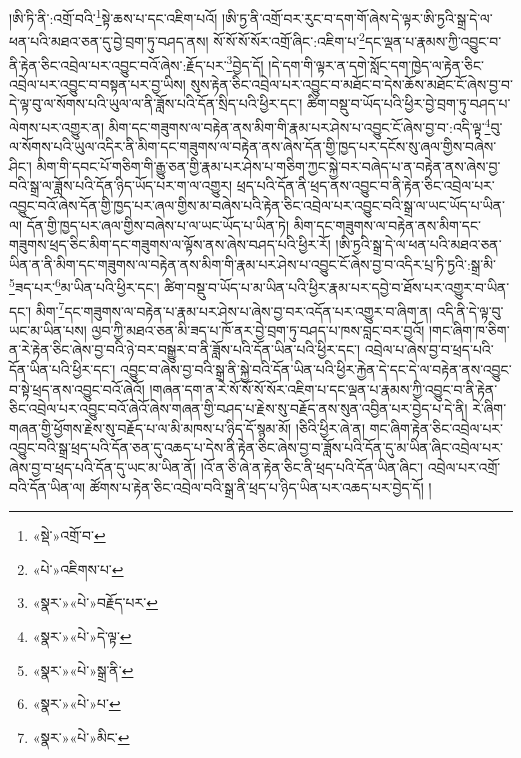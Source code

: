 །ཨི་ཏི་ནི་:འགྲོ་བའི་\footnote{«སྡེ་»འགྲོ་བ་}སྟེ་ཆས་པ་དང་འཇིག་པའོ། །ཨི་ཏྱ་ནི་འགྲོ་བར་རུང་བ་དག་གོ་ཞེས་དེ་ལྟར་ཨི་ཏྱའི་སྒྲ་དེ་ལ་ཕན་པའི་མཐའ་ཅན་དུ་བྱེ་བྲག་ཏུ་བཤད་ནས། སོ་སོ་སོ་སོར་འགྲོ་ཞིང་:འཇིག་པ་\footnote{«པེ་»འཇིགས་པ་}དང་ལྡན་པ་རྣམས་ཀྱི་འབྱུང་བ་ནི་རྟེན་ཅིང་འབྲེལ་པར་འབྱུང་བའོ་ཞེས་:རྗོད་པར་\footnote{«སྣར་»«པེ་»བརྗོད་པར་}བྱེད་དོ། །དེ་དག་གི་ལྟར་ན་དགེ་སློང་དག་ཁྱེད་ལ་རྟེན་ཅིང་འབྲེལ་པར་འབྱུང་བ་བསྟན་པར་བྱ་ཡིས། སུས་རྟེན་ཅིང་འབྲེལ་པར་འབྱུང་བ་མཐོང་བ་དེས་ཆོས་མཐོང་ངོ་ཞེས་བྱ་བ་དེ་ལྟ་བུ་ལ་སོགས་པའི་ཡུལ་ལ་ནི་ཟློས་པའི་དོན་སྲིད་པའི་ཕྱིར་དང་། ཚིག་བསྡུ་བ་ཡོད་པའི་ཕྱིར་བྱེ་བྲག་ཏུ་བཤད་པ་ལེགས་པར་འགྱུར་ན། མིག་དང་གཟུགས་ལ་བརྟེན་ནས་མིག་གི་རྣམ་པར་ཤེས་པ་འབྱུང་ངོ་ཞེས་བྱ་བ་:འདི་ལྟ་\footnote{«སྣར་»«པེ་»དེ་ལྟ་}བུ་ལ་སོགས་པའི་ཡུལ་འདིར་ནི་མིག་དང་གཟུགས་ལ་བརྟེན་ནས་ཞེས་དོན་གྱི་ཁྱད་པར་དངོས་སུ་ཞལ་གྱིས་བཞེས་ཤིང་། མིག་གི་དབང་པོ་གཅིག་གི་རྒྱུ་ཅན་གྱི་རྣམ་པར་ཤེས་པ་གཅིག་ཀྱང་སྐྱེ་བར་བཞེད་པ་ན་བརྟེན་ནས་ཞེས་བྱ་བའི་སྒྲ་ལ་ཟློས་པའི་དོན་ཉིད་ཡོད་པར་ག་ལ་འགྱུར། ཕྲད་པའི་དོན་ནི་ཕྲད་ནས་འབྱུང་བ་ནི་རྟེན་ཅིང་འབྲེལ་པར་འབྱུང་བའོ་ཞེས་དོན་གྱི་ཁྱད་པར་ཞལ་གྱིས་མ་བཞེས་པའི་རྟེན་ཅིང་འབྲེལ་པར་འབྱུང་བའི་སྒྲ་ལ་ཡང་ཡོད་པ་ཡིན་ལ། དོན་གྱི་ཁྱད་པར་ཞལ་གྱིས་བཞེས་པ་ལ་ཡང་ཡོད་པ་ཡིན་ཏེ། མིག་དང་གཟུགས་ལ་བརྟེན་ནས་མིག་དང་གཟུགས་ཕྲད་ཅིང་མིག་དང་གཟུགས་ལ་ལྟོས་ནས་ཞེས་བཤད་པའི་ཕྱིར་རོ། །ཨི་ཏྱའི་སྒྲ་དེ་ལ་ཕན་པའི་མཐའ་ཅན་ཡིན་ན་ནི་མིག་དང་གཟུགས་ལ་བརྟེན་ནས་མིག་གི་རྣམ་པར་ཤེས་པ་འབྱུང་ངོ་ཞེས་བྱ་བ་འདིར་པྲ་ཏི་ཏྱའི་:སྒྲ་མི་\footnote{«སྣར་»«པེ་»སྒྲ་ནི་}ཟད་པར་\footnote{«སྣར་»«པེ་»པ་}མ་ཡིན་པའི་ཕྱིར་དང་། ཚིག་བསྡུ་བ་ཡོད་པ་མ་ཡིན་པའི་ཕྱིར་རྣམ་པར་དབྱེ་བ་ཐོས་པར་འགྱུར་བ་ཡིན་དང་། མིག་\footnote{«སྣར་»«པེ་»མིང་}དང་གཟུགས་ལ་བརྟེན་པ་རྣམ་པར་ཤེས་པ་ཞེས་བྱ་བར་འདོན་པར་འགྱུར་བ་ཞིག་ན། འདི་ནི་དེ་ལྟ་བུ་ཡང་མ་ཡིན་པས། ལྱབ་ཀྱི་མཐའ་ཅན་མི་ཟད་པ་ཁོ་ནར་བྱེ་བྲག་ཏུ་བཤད་པ་ཁས་བླང་བར་བྱའོ། །གང་ཞིག་ཁ་ཅིག་ན་རེ་རྟེན་ཅིང་ཞེས་བྱ་བའི་ཉེ་བར་བསྒྱུར་བ་ནི་ཟློས་པའི་དོན་ཡིན་པའི་ཕྱིར་དང་། འབྲེལ་པ་ཞེས་བྱ་བ་ཕྲད་པའི་དོན་ཡིན་པའི་ཕྱིར་དང་། འབྱུང་བ་ཞེས་བྱ་བའི་སྒྲ་ནི་སྐྱེ་བའི་དོན་ཡིན་པའི་ཕྱིར་རྐྱེན་དེ་དང་དེ་ལ་བརྟེན་ནས་འབྱུང་བ་སྟེ་ཕྲད་ནས་འབྱུང་བའོ་ཞེའོ། །གཞན་དག་ན་རེ་སོ་སོ་སོ་སོར་འཇིག་པ་དང་ལྡན་པ་རྣམས་ཀྱི་འབྱུང་བ་ནི་རྟེན་ཅིང་འབྲེལ་པར་འབྱུང་བའོ་ཞེའོ་ཞེས་གཞན་གྱི་བཤད་པ་རྗེས་སུ་བརྗོད་ནས་སུན་འབྱིན་པར་བྱེད་པ་དེ་ནི། རེ་ཞིག་གཞན་གྱི་ཕྱོགས་རྗེས་སུ་བརྗོད་པ་ལ་མི་མཁས་པ་ཉིད་དོ་སྙམ་མོ། །ཅིའི་ཕྱིར་ཞེ་ན། གང་ཞིག་རྟེན་ཅིང་འབྲེལ་པར་འབྱུང་བའི་སྒྲ་ཕྲད་པའི་དོན་ཅན་དུ་འཆད་པ་དེས་ནི་རྟེན་ཅིང་ཞེས་བྱ་བ་ཟློས་པའི་དོན་དུ་མ་ཡིན་ཞིང་འབྲེལ་པར་ཞེས་བྱ་བ་ཕྲད་པའི་དོན་དུ་ཡང་མ་ཡིན་ནོ། །འོ་ན་ཅི་ཞེ་ན་རྟེན་ཅིང་ནི་ཕྲད་པའི་དོན་ཡིན་ཞིང་། འབྲེལ་པར་འགྲོ་བའི་དོན་ཡིན་ལ། ཚོགས་པ་རྟེན་ཅིང་འབྲེལ་བའི་སྒྲ་ནི་ཕྲད་པ་ཉིད་ཡིན་པར་འཆད་པར་བྱེད་དོ། །
